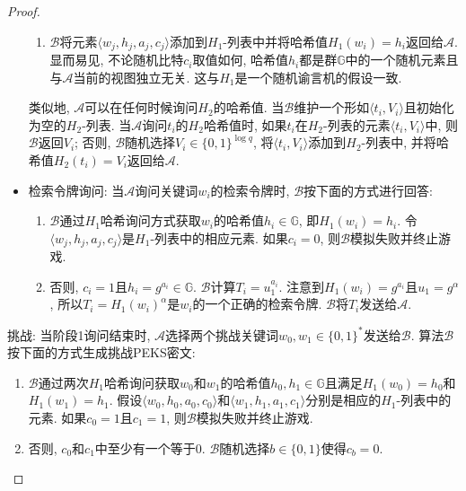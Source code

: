 \begin{proof}
\begin{trivlist}
\begin{itemize}
\begin{enumerate}
\item $\mathcal{B}$将元素$\langle w_j, h_j, a_j, c_j\rangle$添加到$H_1$-列表中并将哈希值$H_1(w_i) = h_i$返回给$\mathcal{A}$. 显而易见, 不论随机比特$c_i$取值如何, 哈希值$h_i$都是群$\mathbb{G}$中的一个随机元素且与$\mathcal{A}$当前的视图独立无关. 这与$H_1$是一个随机谕言机的假设一致.
\end{enumerate}

类似地, $\mathcal{A}$可以在任何时候询问$H_2$的哈希值. 当$\mathcal{B}$维护一个形如$\langle t_i, V_i \rangle$且初始化为空的$H_2$-列表. 当$\mathcal{A}$询问$t_i$的$H_2$哈希值时, 如果$t_i$在$H_2$-列表的元素$\langle t_i, V_i \rangle$中, 则$\mathcal{B}$返回$V_i$; 否则, $\mathcal{B}$随机选择$V_i \in \{0, 1\}^{\log q}$, 将$\langle t_i, V_i \rangle$添加到$H_2$-列表中, 并将哈希值$H_2(t_i) = V_i$返回给$\mathcal{A}$.

\item 检索令牌询问: 当$\mathcal{A}$询问关键词$w_i$的检索令牌时, $\mathcal{B}$按下面的方式进行回答:

\begin{enumerate}
\item $\mathcal{B}$通过$H_1$哈希询问方式获取$w_i$的哈希值$h_i \in \mathbb{G}$, 即$H_1(w_i) = h_i$. 令$\langle w_j, h_j, a_j, c_j\rangle$是$H_1$-列表中的相应元素. 如果$c_i = 0$, 则$\mathcal{B}$模拟失败并终止游戏.

\item 否则, $c_i = 1$且$h_i = g^{a_i} \in \mathbb{G}$. $\mathcal{B}$计算$T_i = u_1^{a_i}$. 注意到$H_1(w_i) = g^{a_i}$且$u_1 = g^\alpha$, 所以$T_i = H_1(w_i)^\alpha$是$w_i$的一个正确的检索令牌. $\mathcal{B}$将$T_i$发送给$\mathcal{A}$.
\end{enumerate}

\end{itemize} 

\item 挑战: 当阶段1询问结束时, $\mathcal{A}$选择两个挑战关键词$w_0, w_1 \in \{0, 1\}^*$发送给$\mathcal{B}$. 算法$\mathcal{B}$按下面的方式生成挑战PEKS密文:

\begin{enumerate}
\item $\mathcal{B}$通过两次$H_1$哈希询问获取$w_0$和$w_1$的哈希值$h_0, h_1 \in \mathbb{G}$且满足$H_1(w_0) = h_0$和$H_1(w_1) = h_1$. 假设$\langle w_0, h_0, a_0, c_0\rangle$和$\langle w_1, h_1, a_1, c_1\rangle$分别是相应的$H_1$-列表中的元素. 如果$c_0 = 1$且$c_1 =1$, 则$\mathcal{B}$模拟失败并终止游戏.

\item 否则, $c_0$和$c_1$中至少有一个等于0. $\mathcal{B}$随机选择$b \in \{0, 1\}$使得$c_b = 0$.


\end{enumerate}
\end{trivlist}
\end{proof}
